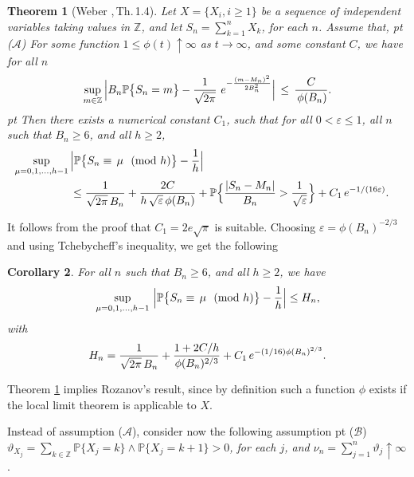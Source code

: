 \documentclass[11pt,draft,reqno]{amsart}
\newtheorem{theorem}{Theorem}[section]
\newtheorem{corollary}[theorem]{Corollary}
\theoremstyle{definition}
\theoremstyle{remarks}
\numberwithin{equation}{section}
\def \e{{\varepsilon}}
\def \t{{\vartheta}}
\def \m{{\mu}}
\def\P{{\mathcal P}}
\def\P{{\mathbb P}}
\def\Z{{\mathbb Z}}
\begin{document}
  
\begin{theorem}[Weber \cite{W10},\,Th.\,1.4] \label{l1a}    Let $X=\{X_i , i\ge 1\}$ be  a sequence of  independent  variables taking values in $\Z$,  
and let $S_n=\sum_{k=1}^n X_k$, for each $n$. Assume that, 
 pt {\rm ($\mathcal A$) \it For some function $1\le \phi(t)\uparrow \infty $ as $t\to \infty$, and some constant $C$, we have for all $n$} 
 \begin{equation}\label{phi.cond}
\sup_{m\in \Z}\Big|B_n\P\big\{ S_n=m\big\}- {1\over   \sqrt{ 2\pi } }\ e^{-
{(m-M_n)^2\over  2 B_n^2} }\Big|\,\le \,  {C\over \,\phi(B_n)}.
 \end{equation}
 pt   Then there exists a numerical constant $C_1$, such that for all $0<\e \le 1$, all  $n $ such that $B_n\ge 6$, and all $h\ge 2$, 
\begin{align*}
\sup_{\m=0,1,\ldots, h-1} \,&\Big|{\mathbb P}\big\{ S_n\equiv\, \m\ \hbox{\rm{ (mod $h$)}}\big\}- \frac{1}{h}\Big|
\cr   &\le   {1\over \sqrt{2\pi}\,  B_n   }+\frac{2C}{h\,\sqrt{\e}\,\phi(B_n)}
+  {\mathbb P}\Big\{   \frac{|S_n -M_n |}{B_n}> \frac{1}{\sqrt \e}\Big\}+C_1 \,e^{-1/(16\e)}.
\end{align*}
\end{theorem}
    It follows from the proof that $C_1=2e\sqrt{\pi}$ is suitable.
    Choosing $\e= \phi(B_n)^{-2/3}$ and using Tchebycheff's inequality, we get the following
 \begin{corollary}\label{}For all   $n $ such that $B_n\ge 6$, and all $h\ge 2$, 
we have 
\begin{align}\label{eps.phi}
\sup_{\m=0,1,\ldots, h-1} \,  \Big|{\mathbb P}\big\{ S_n\equiv\,  \m\ \hbox{\rm{ (mod $h$)}}\big\}- \frac{1}{h}\Big|
 \le H_n ,
\end{align}
with
\begin{align}\label{eps.phi.Hn}
   H_n=  {1\over \sqrt{2\pi}\,  B_n   }+\frac{1+ 2 {C}/{h}
}{ \phi(B_n)^{2/3} } 
+  C_1 \,e^{-(1/ 16 )\phi(B_n)^{2/3}}.
\end{align}
\end{corollary}
 Theorem \ref{l1a}  implies Rozanov's result,  since by  definition such a function $\phi$ exists   if the local limit theorem is applicable to   $X$.          
 
\bigskip\par
  Instead of assumption ($\mathcal A$), consider now the following assumption  
   pt ($\mathcal B$)    {\it $\t_{X_j} =\displaystyle{\sum_{k\in \Z}}{\mathbb P}\{X_j= k\}\wedge{\mathbb P}\{X_j= k+1 \} >0$,  for each $j$, and 
 $\nu_n =\displaystyle{\sum_{j=1}^n} \t_j\uparrow \infty$}.
 
\end{document}
